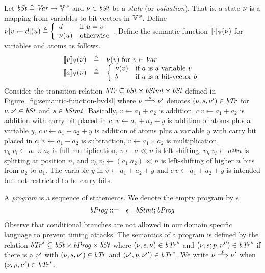 Let $\mathit{bSt} \triangleq \mathit{Var} \rightarrow \mathbb{V}^{\mathit{w}}$ and $\nu \in \mathit{bSt}$ be a \emph{state} (or \emph{valuation}).
That is, a {state} $\nu$ is a mapping from variables to bit-vectors in $\mathbb{V}^{\mathit{w}}$.
Define
$
\nu{[}{v} \leftarrow {d}{]}(u) \triangleq
\left\{
   \begin{array}{ll}
     d & \textmd{if $u = v$}\\
     \nu(u) & \textmd{otherwise}
   \end{array}
\right.
$.
Define the semantic function $[\![{\cdot}]\!]_{\mathbb{V}}(\nu)$ for variables and atoms as follows.
\[
\begin{array}{rcl}
\bvvalueof{v}(\bvst) & \defn & \bvst(v) \textmd{  for ${v} \in \Var$} \\
\bvvalueof{a}(\bvst) & \defn & \left\{
  \begin{array}{ll}
  \bvst(v) & \textmd{if $a$ is a variable $v$} \\
  b & \textmd{if $a$ is a bit-vector $b$} \\
  \end{array}
  \right. \\
\end{array}
\]
Consider the transition relation $\mathit{bTr} \subseteq \mathit{bSt} \times \mathit{bStmt} \times \mathit{bSt}$ defined in Figure~\ref{fig:semantic-function-bvdsl} where
$\nu \overset{s}{\Longrightarrow} \nu'$ denotes $(\nu, s, \nu') \in \mathit{bTr}$
for $\nu, \nu' \in \mathit{bSt}$ and $s \in \mathit{bStmt}$.
Basically, $v \leftarrow a_1 + a_2$ is addition, $c\ v \leftarrow a_1 + a_2$ is addition with carry bit placed in $c$, $v \leftarrow a_1 + a_2 + y$ is addition of atoms plus a variable $y$, $c\ v \leftarrow a_1 + a_2 + y$ is addition of atoms plus a variable $y$ with carry bit placed in $c$, $v \leftarrow a_1 - a_2$ is subtraction, $v \leftarrow a_1 \times a_2$ is multiplication, $v_h\ v_l \leftarrow a_1 \times a_2$ is full multiplication, $v \leftarrow a \ll n$ is left-shifting, $v_h\ v_l \leftarrow a @ n$ is splitting at position $n$, and $v_h\ v_l \leftarrow (a_1 . a_2) \ll n$ is left-shifting of higher $n$ bits from $a_2$ to $a_1$.
The variable $y$ in $v \leftarrow a_1 + a_2 + y$ and $c\ v \leftarrow a_1 + a_2 + y$ is intended but not restricted to be carry bits.

A \emph{program} is a sequence of statements.
We denote the empty program by $\epsilon$.
\begin{eqnarray*}
  \mathit{bProg} & ::= & \epsilon \ |\ \mathit{bStmt}; \mathit{bProg}
\end{eqnarray*}
Observe that conditional branches are not allowed in our domain specific language to prevent timing attacks.
The semantics of a program is defined by the relation $\mathit{bTr}^* \subseteq \mathit{bSt} \times \mathit{bProg} \times \mathit{bSt}$ where $(\nu, \epsilon, \nu) \in \mathit{bTr}^*$ and $(\nu, s; p, \nu'') \in \mathit{bTr}^*$ if there is a $\nu'$ with $(\nu, s, \nu') \in \mathit{bTr}$ and $(\nu', p, \nu'') \in \mathit{bTr}^*$.
We write $\nu \overset{p}{\Longrightarrow} \nu'$ when $(\nu, p, \nu') \in \mathit{bTr}^*$.

